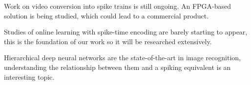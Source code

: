Work on video conversion into spike trains is still ongoing. An FPGA-based solution is being studied, which could lead to a commercial product.

Studies of online learning with spike-time encoding are barely starting to appear, this is the foundation of our work so it will be researched extensively.

Hierarchical deep neural networks are the state-of-the-art in image recognition, understanding the relationship between them and a spiking equivalent is an interesting topic.


